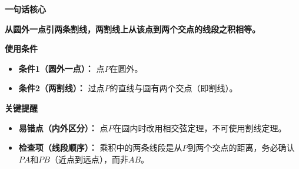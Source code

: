 \begin{summarybox}
	\textbf{\textcolor{CSummary}{一句话核心}}

	\textbf{从圆外一点引两条割线，两割线上从该点到两个交点的线段之积相等。}

	\medskip
	\textbf{\textcolor{CSummary}{使用条件}}
	\begin{itemize}[leftmargin=*, itemsep=0.5em, topsep=0.4em]
		\item \textbf{条件1（圆外一点）：} 点$P$在圆外。
		\item \textbf{条件2（两割线）：} 过点$P$的直线与圆有两个交点（即割线）。
	\end{itemize}

	\medskip
	\textbf{\textcolor{CSummary}{关键提醒}}
	\begin{itemize}[leftmargin=*, itemsep=0.5em, topsep=0.4em]
		\item \textbf{易错点（内外区分）：} 点$P$在圆内时改用相交弦定理，不可使用割线定理。
		\item \textbf{检查项（线段顺序）：} 乘积中的两条线段是从$P$到两个交点的距离，务必确认$PA$和$PB$（近点到远点），而非$AB$。
	\end{itemize}
\end{summarybox}
